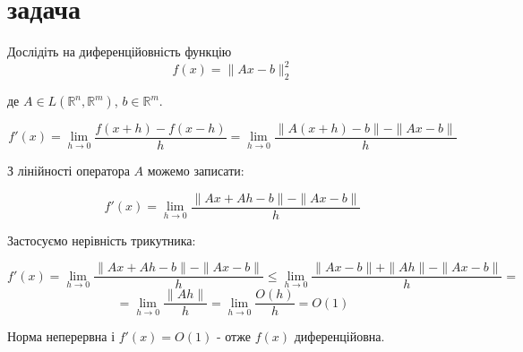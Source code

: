 \section{задача}

\begin{tcolorbox}[title=Умова]
    Дослідіть на диференційовність функцію
    $$ f(x) = \|Ax - b\|_2^2 $$

    де $A \in L(\mathbb{R}^n, \mathbb{R}^m)$, $b \in \mathbb{R}^m$.
\end{tcolorbox}

$$f'(x) = \lim_{h \to 0} \frac{f(x + h) - f(x - h)}{h} = 
\lim_{h \to 0} \frac{\|A(x + h) - b\| - \|Ax - b\|}{h} $$

З лінійності оператора $A$ можемо записати:

$$f'(x) = \lim_{h \to 0} \frac{\|Ax + Ah - b\| - \|Ax - b\|}{h}$$

Застосуємо нерівність трикутника:

$$f'(x) = \lim_{h \to 0} \frac{\|Ax + Ah - b\| - \|Ax - b\|}{h} \le 
\lim_{h \to 0} \frac{\|Ax - b \| + \|Ah\| - \|Ax - b\|}{h} =$$ 
$$=\lim_{h \to 0} \frac{\|Ah\|}{h} = \lim_{h \to 0} \frac{O(h)}{h} = O(1) $$

Норма неперервна і $f'(x) = O(1)$ - отже $f(x)$ диференційовна.
